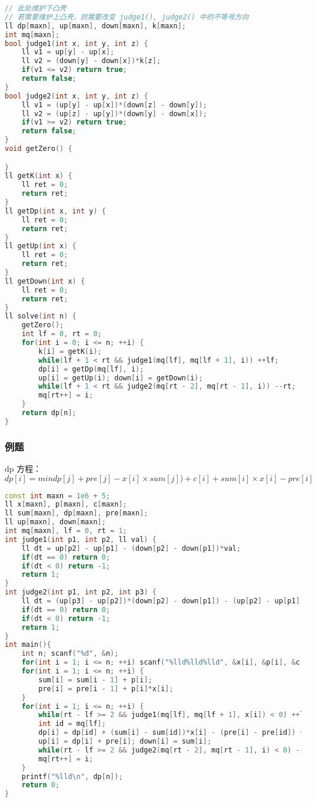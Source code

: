 \begin{lstlisting}[language=C++]
// 此处维护下凸壳
// 若需要维护上凸壳，则需要改变 judge1(), judge2() 中的不等号方向
ll dp[maxn], up[maxn], down[maxn], k[maxn];
int mq[maxn];
bool judge1(int x, int y, int z) {
    ll v1 = up[y] - up[x];
    ll v2 = (down[y] - down[x])*k[z];
    if(v1 <= v2) return true;
    return false;
}
bool judge2(int x, int y, int z) {
    ll v1 = (up[y] - up[x])*(down[z] - down[y]);
    ll v2 = (up[z] - up[y])*(down[y] - down[x]);
    if(v1 >= v2) return true;
    return false;
}
void getZero() {

}
ll getK(int x) {
    ll ret = 0;
    return ret;
}
ll getDp(int x, int y) {
    ll ret = 0;
    return ret;
}
ll getUp(int x) {
    ll ret = 0;
    return ret;
}
ll getDown(int x) {
    ll ret = 0;
    return ret;
}
ll solve(int n) {
    getZero();
    int lf = 0, rt = 0;
    for(int i = 0; i <= n; ++i) {
        k[i] = getK(i);
        while(lf + 1 < rt && judge1(mq[lf], mq[lf + 1], i)) ++lf;
        dp[i] = getDp(mq[lf], i);
        up[i] = getUp(i); down[i] = getDown(i);
        while(lf + 1 < rt && judge2(mq[rt - 2], mq[rt - 1], i)) --rt;
        mq[rt++] = i;
    }
    return dp[n];
}
\end{lstlisting}

\subsubsection{例题}

dp 方程：$dp[i] = min{dp[j] + pre[j] − x[i] × sum[j])} + c[i] + sum[i] × x[i] − pre[i]$

\begin{lstlisting}[language=C++]
const int maxn = 1e6 + 5;
ll x[maxn], p[maxn], c[maxn];
ll sum[maxn], dp[maxn], pre[maxn];
ll up[maxn], down[maxn];
int mq[maxn], lf = 0, rt = 1;
int judge1(int p1, int p2, ll val) {
    ll dt = up[p2] - up[p1] - (down[p2] - down[p1])*val;
    if(dt == 0) return 0;
    if(dt < 0) return -1;
    return 1;
}
int judge2(int p1, int p2, int p3) {
    ll dt = (up[p3] - up[p2])*(down[p2] - down[p1]) - (up[p2] - up[p1])*(down[p3] - down[p2]);
    if(dt == 0) return 0;
    if(dt < 0) return -1;
    return 1;
}
int main(){
    int n; scanf("%d", &n);
    for(int i = 1; i <= n; ++i) scanf("%lld%lld%lld", &x[i], &p[i], &c[i]);
    for(int i = 1; i <= n; ++i) {
        sum[i] = sum[i - 1] + p[i];
        pre[i] = pre[i - 1] + p[i]*x[i];
    }
    for(int i = 1; i <= n; ++i) {
        while(rt - lf >= 2 && judge1(mq[lf], mq[lf + 1], x[i]) < 0) ++lf;
        int id = mq[lf];
        dp[i] = dp[id] + (sum[i] - sum[id])*x[i] - (pre[i] - pre[id]) + c[i];
        up[i] = dp[i] + pre[i]; down[i] = sum[i];
        while(rt - lf >= 2 && judge2(mq[rt - 2], mq[rt - 1], i) < 0) --rt;
        mq[rt++] = i;
    }
    printf("%lld\n", dp[n]);
    return 0;
}
\end{lstlisting}

